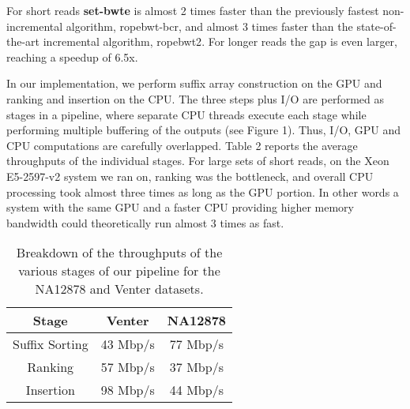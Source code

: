\documentclass{acmsiggraph}
\begin{document}
For short reads {\bf set-bwte} is almost 2 times faster than the previously fastest non-incremental algorithm, {ropebwt-bcr}, and almost 3 times faster than the state-of-the-art incremental algorithm, {ropebwt2}.
For longer reads the gap is even larger, reaching a speedup of 6.5x.

In our implementation, we perform suffix array construction on the GPU and ranking and insertion on the CPU. The three steps plus I/O are performed as stages in a pipeline,
where separate CPU threads execute each stage while performing multiple buffering of the outputs (see Figure 1). Thus, I/O, GPU and CPU computations are carefully overlapped.
Table 2 reports the average throughputs of the individual stages.
For large sets of short reads, on the Xeon E5-2597-v2 system we ran on, ranking was the bottleneck, and overall CPU processing took almost
three times as long as the GPU portion.
In other words a system with the same GPU and a faster CPU providing higher memory bandwidth could theoretically run almost 3 times as fast.

\begin{table}[ht] 
	\centering
{
\begin{tabulary}{1.0\textwidth}{|c|c|c|}
\hline
Stage & Venter & NA12878 \\
\hline
Suffix Sorting & 43 Mbp/s & 77 Mbp/s \\
\hline
Ranking & 57 Mbp/s & 37 Mbp/s \\
\hline
Insertion & 98 Mbp/s & 44 Mbp/s \\
\hline
\end{tabulary}
}
\caption{\label{Table:Breakdown} Breakdown of the throughputs of the various stages of our pipeline for the NA12878 and Venter datasets.}\vspace*{-0.2cm}
\end{table}
\end{document}
